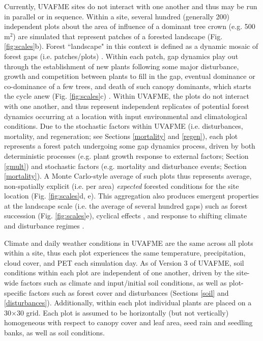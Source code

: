 \documentclass[a4paper, 12pt] {report}
\begin{document}
Currently, UVAFME sites do not interact with one another and thus may be run in parallel or in sequence. Within a site, several hundred (generally 200) independent plots about the area of influence of a dominant tree crown (e.g. 500 m$^{2}$) are simulated that represent patches of a forested landscape (Fig. \ref{fig:scales}b). Forest ``landscape" in this context is defined as a dynamic mosaic of forest gaps (i.e. patches/plots) \cite{shugartModelingForestLandscapes1985}. Within each patch, gap dynamics play out through the establishment of new plants following some major disturbance, growth and competition between plants to fill in the gap,  eventual dominance or co-dominance of a few trees, and death of such canopy dominants, which starts the cycle anew (Fig. \ref{fig:scales}c) \cite{shugartTheoryForestDynamics1984}. Within UVAFME, the plots do not interact with one another, and thus represent independent replicates of potential forest dynamics occurring at a location with input environmental and climatological conditions. Due to the stochastic factors within UVAFME (i.e. disturbances, mortality, and regeneration; see Sections \ref{mortality} and \ref{regen}), each plot represents a forest patch undergoing some gap dynamics process, driven by both deterministic processes (e.g. plant growth response to external factors; Section \ref{gmult}) and stochastic factors (e.g. mortality and disturbance events; Section \ref{mortality}). A Monte Carlo-style average of such plots thus represents average, non-spatially explicit (i.e. per area) \textit{expected} forested conditions for the site location (Fig. \ref{fig:scales}d, e). This aggregation also produces emergent properties at the landscape scale (i.e. the average of several hundred gaps) such as forest succession (Fig. \ref{fig:scales}e), cyclical effects , and response to shifting climate and disturbance regimes \cite{fosterValidationApplicationForest2017, shumanFireDisturbanceClimate2017, shugartGapModelsTheir2018}.

Climate and daily weather conditions in UVAFME are the same across all plots within a site, thus each plot experiences the same temperature, precipitation, cloud cover, and PET each simulation day. As of Version 3 of UVAFME, soil conditions within each plot are independent of one another, driven by the site-wide factors such as climate and input/initial soil conditions, as well as plot-specific factors such as forest cover and disturbances (Sections \ref{soil} and \ref{disturbances}). Additionally, within each plot individual plants are placed on a 30$\times$30 grid. Each plot is assumed to be horizontally (but not vertically) homogeneous with respect to canopy cover and leaf area, seed rain and seedling banks, as well as soil conditions.
\end{document}

